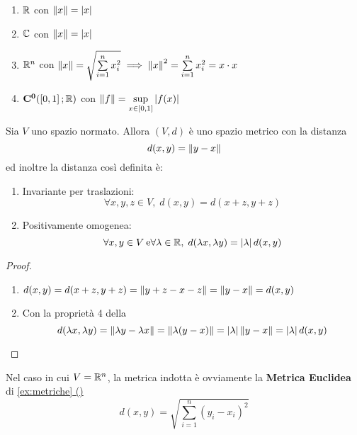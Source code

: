 \begin{example}\leavevmode\vspace*{-\baselineskip}
	\label{ex:sp_norm}
	\begin{enumerate}
		\item $\mathbb{R}$ con $\left\|x\right\| = \left|x\right|$
		\item $\mathbb{C}$ con $\left\|x\right\| = \left|x\right|$
		\item $\mathbb{R}^n$ con $\left\|x\right\| = \sqrt{\sum\limits_{i=1}^{n}x_i^2} \implies \left\|x\right\|^2 = \sum\limits_{i=1}^{n}x_i^2 = x \cdot x$
		\item $\mathbf{C^{0}}(\left[0,1\right];\mathbb{R})$ con $\left\|f\right\| = \sup\limits_{x \in \left[0,1\right]} \left|f(x)\right|$
	\end{enumerate}
\end{example}

\begin{proposition}
	\label{prop:dist_sp_norm}
	Sia $V$ uno spazio normato. Allora $(V,d)$ è uno spazio metrico con la distanza
	\[d(x,y) = \left\|y-x\right\|\]
	ed inoltre la distanza così definita è:
	\begin{enumerate}
		\item Invariante per traslazioni:
			\[\forall x,y,z \in V,\; d(x,y) = d(x+z, y+z)\]
		\item Positivamente omogenea:
			\[\forall x,y \in V\: \text{e} \forall \lambda \in \mathbb{R},\; d(\lambda x, \lambda y) = \left|\lambda\right|d(x,y)\]
	\end{enumerate}
	\begin{proof}
		~
		\begin{enumerate}
			\item $d(x,y) = d(x+z, y+z) = \left\|y+z-x-z\right\| = \left\|y-x\right\| = d(x,y)$
			\item Con la proprietà 4 della 
			\[d(\lambda x, \lambda y) = \left\|\lambda y - \lambda x\right\| = \left\|\lambda (y - x)\right\| = \left|\lambda\right| \left\|y - x\right\| = \left|\lambda\right|d(x,y)\]
		\end{enumerate}
	\end{proof}
	\begin{note}
		Nel caso in cui $V = \mathbb{R}^n$, la metrica indotta è ovviamente la \textbf{Metrica Euclidea} di \hyperref[ex:dist_eucl]{\cref*{ex:metriche} ()}
		\[d(x,y) = \sqrt{\sum\limits_{i=1}^{n} (y_i-x_i)^2 }\]
	\end{note}
\end{proposition}

